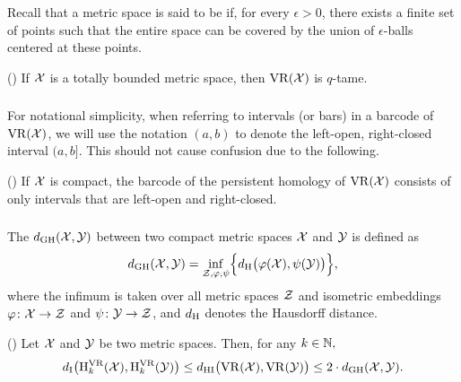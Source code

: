 Recall that a metric space is said to be  if, for every $\epsilon > 0$, there exists a finite set of points such that the entire space can be covered by the union of $\epsilon$-balls centered at these points.

\proposition (\cite[Proposition~5.1]{chazal2014geometric})
If $\cX$ is a totally bounded metric space, then $\VR(\cX)$ is $q$-tame.

\subsubsection{}

For notational simplicity, when referring to intervals (or bars) in a barcode of $\VR(\cX)$, we will use the notation $(a, b)$ to denote the left-open, right-closed interval $(a, b]$.
This should not cause confusion due to the following.

\proposition (\cite[Theorem~5.2]{lim2024vietoris})
If $\cX$ is compact, the barcode of the persistent homology of $\VR(\cX)$ consists of only intervals that are left-open and right-closed.

\subsubsection{}\label{thm:stability-HI}

The  $\dgh(\cX, \cY)$ between two compact metric spaces $\cX$ and $\cY$ is defined as
\[
\dgh(\cX, \cY) = \inf_{\cZ, \varphi, \psi} \set[\Big]{d_\rH\big(\varphi(\cX), \psi(\cY)\big)},
\]
where the infimum is taken over all metric spaces $\cZ$ and isometric embeddings $\varphi \colon \cX \to \cZ$ and $\psi \colon \cY \to \cZ$, and $d_\rH$ denotes the Hausdorff distance.

\proposition (\cite[Theorems~1.9 and~1.10]{blumberg2023interleaving})
Let $\cX$ and $\cY$ be two metric spaces.
Then, for any $k \in \N,$
\[
\di\big(\rH_k^\VR(\cX), \rH_k^\VR(\cY)\big) \leq
\dhi\big(\VR(\cX), \VR(\cY)\big) \leq
2 \cdot \dgh(\cX, \cY).
\]
